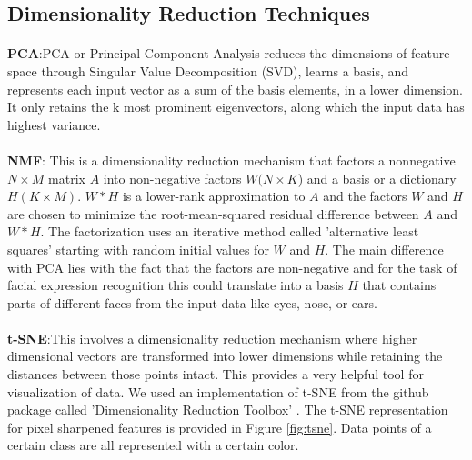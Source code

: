 \documentclass[10pt,twocolumn,letterpaper]{article}
\begin{document}
\paragraph{}

\subsection{Dimensionality Reduction Techniques}
\paragraph{}
\textbf{PCA}:PCA or Principal Component Analysis reduces the dimensions of feature space through Singular Value Decomposition (SVD), learns a basis, and represents each input vector as a sum of the basis elements, in a lower dimension. It only retains the k most prominent eigenvectors, along which the input data has highest variance. 

\paragraph{}
\textbf{NMF}: This is a dimensionality reduction mechanism that factors a nonnegative $N \times M$ matrix $A$ into non-negative factors $W(N \times K$) and a basis or a dictionary $H(K \times M)$.  $W*H$ is a lower-rank approximation to $A$ and the factors $W$ and $H$ are chosen to minimize the root-mean-squared residual difference between $A$ and $W*H$. The factorization uses an iterative method called 'alternative least squares' starting with random initial values for $W$ and $H$. The main difference with PCA lies with the fact that the factors are non-negative and for the task of facial expression recognition this could translate into a basis $H$ that contains parts of different faces from the input data like eyes, nose, or ears.

\paragraph{}
\textbf{t-SNE}:This involves a dimensionality reduction mechanism where higher dimensional vectors are transformed into lower dimensions while retaining the distances between those points intact. This provides a very helpful tool for visualization of data. We used an implementation of t-SNE from the github package called 'Dimensionality Reduction Toolbox' \cite{drtoolbox}. The t-SNE representation for pixel sharpened features is provided in Figure \ref{fig:tsne}. Data points of a certain class are all represented with a certain color. 
\end{document}
